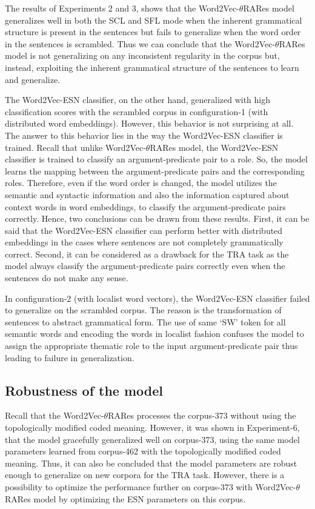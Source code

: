 The results of Experiments 2 and 3, shows that the Word2Vec-$\theta$RARes model generalizes well in both the SCL and SFL mode when the inherent grammatical structure is present in the sentences but fails to generalize when the word order in the sentences is scrambled. Thus we can conclude that the Word2Vec-$\theta$RARes model is not generalizing on any inconsistent regularity in the corpus but, instead, exploiting the inherent grammatical structure of the sentences to learn and generalize.

The Word2Vec-ESN classifier, on the other hand, generalized with high classification scores with the scrambled corpus in configuration-1 (with distributed word embeddings). However, this behavior is not surprising at all. The answer to this behavior lies in the way the Word2Vec-ESN classifier is trained. Recall that unlike Word2Vec-$\theta$RARes model, the Word2Vec-ESN classifier is trained to classify an argument-predicate pair to a role. So, the model learns the mapping between the argument-predicate pairs and the corresponding roles. Therefore, even if the word order is changed, the model utilizes the semantic and syntactic information and also the information captured about context words in word embeddings, to classify the argument-predicate pairs correctly. Hence, two conclusions can be drawn from these results. First, it can be said that the Word2Vec-ESN classifier can perform better with distributed embeddings in the cases where sentences are not completely grammatically correct. Second, it can be considered as a drawback for the TRA task as the model always classify the argument-predicate pairs correctly even when the sentences do not make any sense.

In configuration-2 (with localist word vectors), the Word2Vec-ESN classifier failed to generalize on the scrambled corpus. The reason is the transformation of sentences to abstract grammatical form. The use of same `SW' token for all semantic words and encoding the words in localist fashion confuses the model to assign the appropriate thematic role to the input argument-predicate pair thus leading to failure in generalization. 

\subsection{Robustness of the model}

Recall that the Word2Vec-$\theta$RARes processes the corpus-373 without using the topologically modified coded meaning. However, it was shown in Experiment-6, that the model gracefully generalized well on corpus-373, using the same model parameters learned from corpus-462 with the topologically modified coded meaning. Thus, it can also be concluded that the model parameters are robust enough to generalize on new corpora for the TRA task. However, there is a possibility to optimize the performance further on corpus-373 with Word2Vec-$\theta$RARes model by optimizing the ESN parameters on this corpus.

